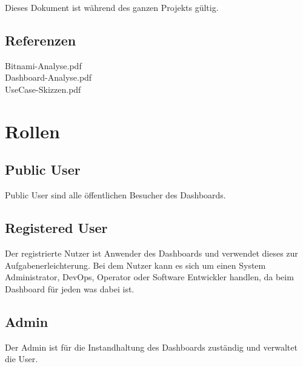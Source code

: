 \documentclass[11pt]{scrartcl}
\begin{document}
Dieses Dokument ist während des ganzen Projekts gültig.

\subsection{Referenzen}
Bitnami-Analyse.pdf\\
Dashboard-Analyse.pdf\\
UseCase-Skizzen.pdf

\section{Rollen}
\subsection{Public User}
Public User sind alle öffentlichen Besucher des Dashboards.

\subsection{Registered User}
Der registrierte Nutzer ist Anwender des Dashboards und verwendet dieses zur 
Aufgabenerleichterung.
Bei dem Nutzer kann es sich um einen System Administrator, DevOps, Operator oder
Software Entwickler handlen, da beim Dashboard für jeden was dabei ist.

\subsection{Admin}
Der Admin ist für die Instandhaltung des Dashboards zuständig und verwaltet die 
User.
\end{document}
